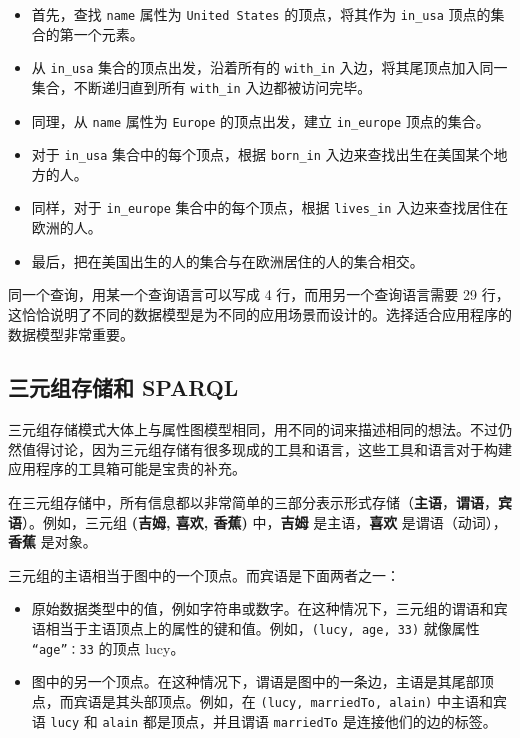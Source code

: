 \begin{itemize}
    \item 首先，查找 \texttt{name} 属性为 \texttt{United States} 的顶点，将其作为 \texttt{in\_usa} 顶点的集合的第一个元素。
    \item 从 \texttt{in\_usa} 集合的顶点出发，沿着所有的 \texttt{with\_in} 入边，将其尾顶点加入同一集合，不断递归直到所有 \texttt{with\_in} 入边都被访问完毕。
    \item 同理，从 \texttt{name} 属性为 \texttt{Europe} 的顶点出发，建立 \texttt{in\_europe} 顶点的集合。
    \item 对于 \texttt{in\_usa} 集合中的每个顶点，根据 \texttt{born\_in} 入边来查找出生在美国某个地方的人。
    \item 同样，对于 \texttt{in\_europe} 集合中的每个顶点，根据 \texttt{lives\_in} 入边来查找居住在欧洲的人。
    \item 最后，把在美国出生的人的集合与在欧洲居住的人的集合相交。
\end{itemize}

同一个查询，用某一个查询语言可以写成 4 行，而用另一个查询语言需要 29 行，这恰恰说明了不同的数据模型是为不同的应用场景而设计的。选择适合应用程序的数据模型非常重要。

\subsection{三元组存储和 SPARQL}

三元组存储模式大体上与属性图模型相同，用不同的词来描述相同的想法。不过仍然值得讨论，因为三元组存储有很多现成的工具和语言，这些工具和语言对于构建应用程序的工具箱可能是宝贵的补充。

在三元组存储中，所有信息都以非常简单的三部分表示形式存储（\textbf{主语}，\textbf{谓语}，\textbf{宾语}）。例如，三元组 \textbf{(吉姆, 喜欢, 香蕉)} 中，\textbf{吉姆} 是主语，\textbf{喜欢} 是谓语（动词），\textbf{香蕉} 是对象。

三元组的主语相当于图中的一个顶点。而宾语是下面两者之一：

\begin{itemize}
    \item 原始数据类型中的值，例如字符串或数字。在这种情况下，三元组的谓语和宾语相当于主语顶点上的属性的键和值。例如，\texttt{(lucy, age, 33)} 就像属性 \texttt{{“age”：33}} 的顶点 lucy。
    \item 图中的另一个顶点。在这种情况下，谓语是图中的一条边，主语是其尾部顶点，而宾语是其头部顶点。例如，在 \texttt{(lucy, marriedTo, alain)} 中主语和宾语 \texttt{lucy} 和 \texttt{alain} 都是顶点，并且谓语 \texttt{marriedTo} 是连接他们的边的标签。
\end{itemize}


